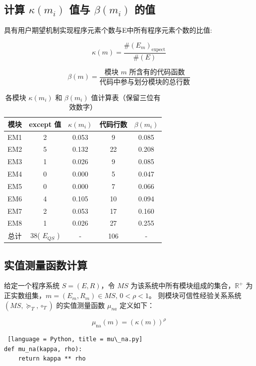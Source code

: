 \documentclass[14pt,a4paper,UTF8,twoside]{article}
\begin{document}
\subsection{计算 \texorpdfstring{$\kappa(m_i)$}{kappa(m_i)} 值与 \texorpdfstring{$\beta(m_i)$}{beta(m_i)} 的值 }

具有用户期望机制实现程序元素个数与E中所有程序元素个数的比值:

\[
\kappa(m) = \frac{\#(E_m)_{\text{expect}}}{\#(E)}
\]

\[
\beta(m) = \frac{\text{模块 } m \text{ 所含有的代码函数}}{\text{代码中参与划分模块的总行数}}
\]


\begin{table}[H]
    \centering
    \begin{tabular}{|c|c|c|c|c|}
    \hline
    \textbf{模块} & \textbf{except 值} & \textbf{\(\kappa(m_i)\)} & \textbf{代码行数} & \textbf{\(\beta(m_i)\)} \\ \hline
    EM1 & 2 & 0.053 & 9 & 0.085 \\ \hline
    EM2 & 5 & 0.132 & 22 & 0.208 \\ \hline
    EM3 & 1 & 0.026 & 9 & 0.085 \\ \hline
    EM4 & 0 & 0.000 & 5 & 0.047 \\ \hline
    EM5 & 0 & 0.000 & 7 & 0.066 \\ \hline
    EM6 & 4 & 0.105 & 10 & 0.094 \\ \hline
    EM7 & 2 & 0.053 & 17 & 0.160 \\ \hline
    EM8 & 1 & 0.026 & 27 & 0.255 \\ \hline
    总计 & 38( $E_{QS}$ ) & - & 106 & - \\ \hline
    \end{tabular}
    \caption{各模块 \(\kappa(m_i)\) 和 \(\beta(m_i)\) 值计算表（保留三位有效数字）}
\end{table}

\subsection{实值测量函数计算}

给定一个程序系统 $S = (E, R)$，令 $MS$ 为该系统中所有模块组成的集合，$\mathbb{R}^+$ 为正实数组集，$m = (E_m, R_m) \in MS, \, 0 < \rho < 1$。
则模块可信性经验关系系统 $(MS, \succeq_T, \circ_T)$ 的实值测量函数 $\mu_{na}$ 定义如下：

\[
\mu_{\text{na}}(m) = (\kappa(m))^\rho
\]

\begin{lstlisting} [language = Python, title = mu\_na.py]
def mu_na(kappa, rho):
    return kappa ** rho
\end{lstlisting}
\end{document}
